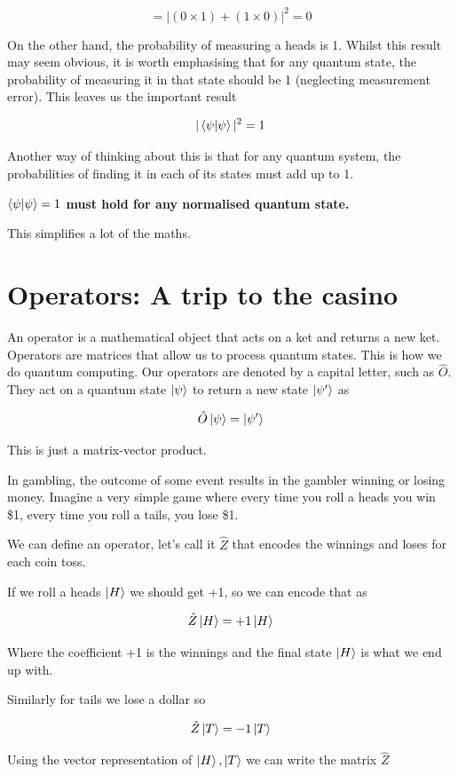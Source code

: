 $$
= \left| (0 \times 1) + (1 \times 0) \right|^2 = 0 
$$

On the other hand, the probability of measuring a heads is 1. Whilst this result may seem obvious, it is worth emphasising that for any quantum state, the probability of measuring it in that state should be 1 (neglecting measurement error). This leaves us the important result

$$ |\braket{\psi|\psi}|^2 = 1 $$

Another way of thinking about this is that for any quantum system, the probabilities of finding it in each of its states must add up to 1. 

\textbf{$ \braket{\psi|\psi} = 1 $ must hold for any normalised quantum state.}

This simplifies a lot of the maths. 

\section{ Operators: A trip to the casino} \label{casino}

An operator is a mathematical object that acts on a ket and returns a new ket. Operators are matrices that allow us to process quantum states. This is how we do quantum computing. Our operators are denoted by a capital letter, such as  $\hat{O}$. They act on a quantum state $\ket{\psi}$ to return a new state $\ket{\psi'}$ as 

$$\hat{O}\ket{\psi} = \ket{\psi'}$$

This is just a matrix-vector product. 

In gambling, the outcome of some event results in the gambler winning or losing money. Imagine a very simple game where every time you roll a heads you win \$1, every time you roll a tails, you lose \$1. 

We can define an operator, let's call it $\hat{Z}$ that encodes the winnings and loses for each coin toss. 

If we roll a heads $\ket{H}$ we should get +1, so we can encode that as 

$$
\hat{Z}\ket{H} = +1 \ket{H}
$$

Where the coefficient +1 is the winnings and the final state $\ket{H}$ is what we end up with. 

Similarly for tails we lose a dollar so 

$$
\hat{Z}\ket{T} = -1 \ket{T}
$$

Using the vector representation of $\ket{H}, \ket{T}$ we can write the matrix $\hat{Z}$

